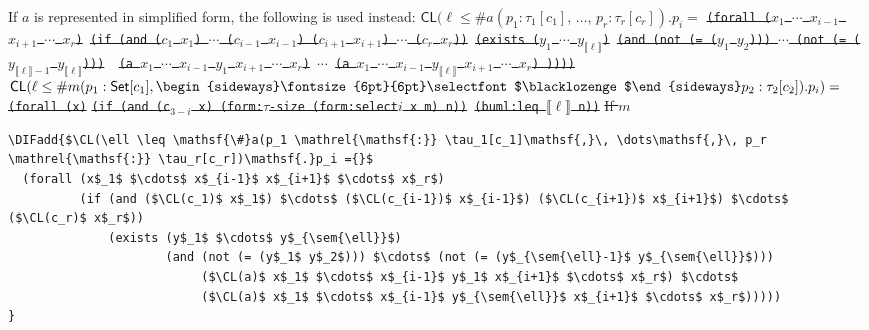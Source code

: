 \documentclass[10pt,fleqn,final]{scrreprt}
\newcommand*{\CL}{\ensuremath{\mathsf{CL}}\xspace}
\newenvironment{definitions}[0]{\medskip }{}
\newcommand{\composition}{\raisebox{0.2pt}{\begin{sideways}\fontsize{6pt}{6pt}\selectfont$\blacklozenge$\end{sideways}}}
\newcommand{\sem}[1]{\mathopen\llbracket#1\mathclose\rrbracket}
\newcommand{\white}[1]{{\color{white}{#1}}}
\newcommand{\qqquad}{\white{x}\qquad}
\providecommand{\DIFadd}[1]{{\protect\color{blue}\uwave{#1}}} %
\providecommand{\DIFdel}[1]{{\protect\color{red}\sout{#1}}}                      %
\providecommand{\DIFaddbegin}{} %
\providecommand{\DIFaddend}{} %
\providecommand{\DIFdelbegin}{} %
\providecommand{\DIFdelend}{} %
\begin{document}
\begin{definitions}
\noindent \DIFaddend If $a$ is represented in simplified form, the following is used instead:
\DIFdelbegin %
\DIFdel{$\CL(\ell \leq \mathsf{\#}a(p_1 \mathrel{\mathsf{:}} \tau_1[c_1]\mathsf{,}\, \dots\mathsf{,}\, p_r \mathrel{\mathsf{:}} \tau_r[c_r])\mathsf{.}p_i=$}%
\texttt{\DIFdel{(forall ($x_1$ $\cdots$ $x_{i-1}$ $x_{i+1}$ $\cdots$ $x_r$)}%
\DIFdel{(if (and ($c_1$ $x_1$) $\cdots$ ($c_{i-1}$ $x_{i-1}$) ($c_{i+1}$ $x_{i+1}$) $\cdots$ ($c_r$ $x_r$))}%
\DIFdel{(exists ($y_1$ $\cdots$ $y_{\sem{\ell}}$)}%
\DIFdel{(and (not (= ($y_1$ $y_2$))) $\cdots$  (not (= ($y_{\sem{\ell}-1}$ $y_{\sem{\ell}}$))) }%
\DIFdel{(a $x_1$ $\cdots$ $x_{i-1}$ $y_1$ $x_{i+1}$ $\cdots$ $x_r$)}%
\DIFdel{$\cdots$}%
\DIFdel{(a $x_1$ $\cdots$ $x_{i-1}$ $y_{\sem{\ell}}$ $x_{i+1}$ $\cdots$ $x_r$) ))))}}
\DIFdel{$\CL(\ell \leq \mathsf{\#}m(p_1 \mathrel{\mathsf{:}} \mathsf{Set}[c_1]\mathsf{,}\, \composition p_2 \mathrel{\mathsf{:}} \tau_2[c_2])\mathsf{.}p_i)=$}%
\texttt{\DIFdel{(forall (x)}}%
\texttt{\DIFdel{(if (and (c$_{3-i}$ x) (form:$\tau$-size (form:select$i$ x m) n))}%
\DIFdel{(buml:leq $\sem{\ell}$ n))}}%
\DIFdel{If $m$ }\DIFdelend \DIFaddbegin \begin{lstlisting}[language=clif, mathescape]
\DIFadd{$\CL(\ell \leq \mathsf{\#}a(p_1 \mathrel{\mathsf{:}} \tau_1[c_1]\mathsf{,}\, \dots\mathsf{,}\, p_r \mathrel{\mathsf{:}} \tau_r[c_r])\mathsf{.}p_i ={}$
  (forall (x$_1$ $\cdots$ x$_{i-1}$ x$_{i+1}$ $\cdots$ x$_r$)
          (if (and ($\CL(c_1)$ x$_1$) $\cdots$ ($\CL(c_{i-1})$ x$_{i-1}$) ($\CL(c_{i+1})$ x$_{i+1}$) $\cdots$ ($\CL(c_r)$ x$_r$))
              (exists (y$_1$ $\cdots$ y$_{\sem{\ell}}$)
                      (and (not (= (y$_1$ y$_2$))) $\cdots$ (not (= (y$_{\sem{\ell}-1}$ y$_{\sem{\ell}}$)))
                           ($\CL(a)$ x$_1$ $\cdots$ x$_{i-1}$ y$_1$ x$_{i+1}$ $\cdots$ x$_r$) $\cdots$
                           ($\CL(a)$ x$_1$ $\cdots$ x$_{i-1}$ y$_{\sem{\ell}}$ x$_{i+1}$ $\cdots$ x$_r$)))))
}\end{lstlisting}


\end{definitions}
\end{document}
